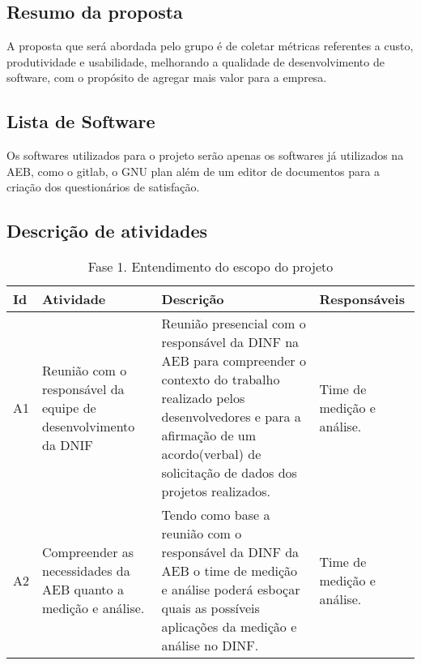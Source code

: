 \subsection{Resumo da proposta}
	A proposta que será abordada pelo grupo é de coletar métricas referentes a custo, produtividade e usabilidade, melhorando a qualidade de desenvolvimento de software, com o propósito de agregar mais valor para a empresa.

\subsection{Lista de Software}
  Os softwares utilizados para o projeto serão apenas os softwares já utilizados na AEB, como o gitlab, o GNU plan além de um editor de documentos para a criação dos questionários de satisfação.

\subsection{Descrição de atividades}

\begin{table}[H]
\centering
\begin{tabular}{|p{1cm}|p{2cm}|p{5cm}|p{3cm}|}
\hline
	\textbf{Id} &
	\textbf{Atividade} &
	\textbf{Descrição} &
  \textbf{Responsáveis}
	\\ \hline
	A1 &
	Reunião com o responsável da equipe de desenvolvimento da DNIF &
	Reunião presencial com o responsável da DINF na AEB para compreender o contexto do trabalho realizado pelos desenvolvedores e para a afirmação de um acordo(verbal) de solicitação de dados dos projetos realizados. &
	Time de medição e análise.
	\\ \hline
	A2 &
	Compreender as necessidades da AEB quanto a medição e análise. &
	Tendo como base a reunião com o responsável da DINF da AEB o time de medição e análise poderá esboçar quais as possíveis aplicações  da medição e análise no DINF. &
	Time de medição e análise.
	\\ \hline

\end{tabular}
\caption{Fase 1. Entendimento do escopo do projeto}
\label{tab:atividades_fase_1}
\end{table}

